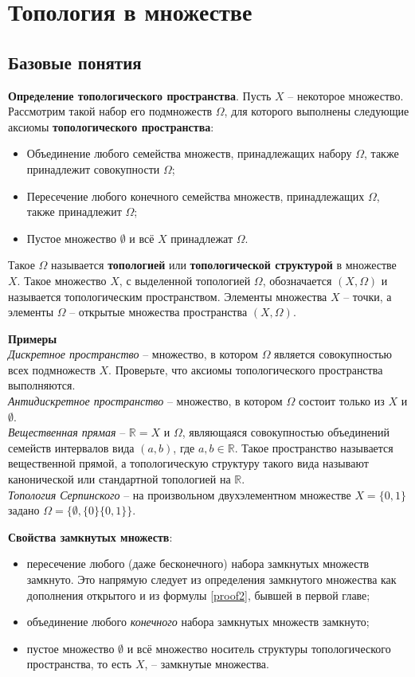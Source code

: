 \documentclass[a4paper]{book}
\begin{document}
\section{Топология в множестве}
\subsection{Базовые понятия}
\textbf{Определение топологического пространства}. Пусть $X$ -- некоторое множество. Рассмотрим такой набор его подмножеств $\Omega$, для которого выполнены следующие аксиомы \textbf{топологического пространства}: 
\begin{itemize}
	\item Объединение любого семейства множеств, принадлежащих набору $\Omega$, также принадлежит совокупности $\Omega$;
	\item Пересечение любого конечного семейства множеств, принадлежащих $\Omega$, также принадлежит $\Omega$;
	\item Пустое множество $\emptyset$ и всё $X$ принадлежат $\Omega$. 
\end{itemize}

Такое $\Omega$ называется \textbf{топологией} или \textbf{топологической структурой} в множестве $X$. Такое множество $X$, с выделенной топологией $\Omega$, обозначается $(X,\Omega)$ и называется топологическим пространством. 
Элементы множества $X$ -- точки, а элементы $\Omega$ -- открытые множества пространства $(X,\Omega)$.

\textbf{Примеры}
\\ 
\textit{Дискретное пространство} -- множество, в котором $\Omega$ является совокупностью всех подмножеств $X$. Проверьте, что аксиомы топологического пространства выполняются.
\\ 
\textit{Антидискретное пространство} -- множество, в котором $\Omega$ состоит только из $X$ и $\emptyset$. 
\\
\textit{Вещественная прямая} -- $\mathbb{R} = X$ и $\Omega$, являющаяся совокупностью объединений семейств интервалов вида $(a,b)$, где $a,b\in\mathbb{R}$. Такое пространство называется вещественной прямой, а топологическую структуру такого вида называют канонической или стандартной топологией на $\mathbb{R}$. 
\\
\textit{Топология Серпинского} -- на произвольном двухэлементном множестве $X = \{0,1\}$ задано $\Omega = \{\emptyset, \{0\}\{0,1\}\}$. 

\textbf{Свойства замкнутых множеств}:
\begin{itemize}
	\item пересечение любого (даже бесконечного) набора замкнутых множеств замкнуто. Это напрямую следует из определения замкнутого множества как дополнения открытого и из формулы \ref{proof2}, бывшей в первой главе; 
	\item объединение любого \textit{конечного} набора замкнутых множеств замкнуто;
	\item пустое множество $\emptyset$ и всё множество носитель структуры топологического пространства, то есть $X$, -- замкнутые множества.
\end{itemize}
\end{document}

